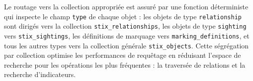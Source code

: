 Le routage vers la collection appropriée est assuré par une fonction déterministe qui inspecte le champ \texttt{type} de chaque objet : les objets de type \texttt{relationship} sont dirigés vers la collection \texttt{stix\_relationships}, les objets de type \texttt{sighting} vers \texttt{stix\_sightings}, les définitions de marquage vers \texttt{marking\_definitions}, et tous les autres types vers la collection générale \texttt{stix\_objects}. Cette ségrégation par collection optimise les performances de requêtage en réduisant l'espace de recherche pour les opérations les plus fréquentes : la traversée de relations et la recherche d'indicateurs.
